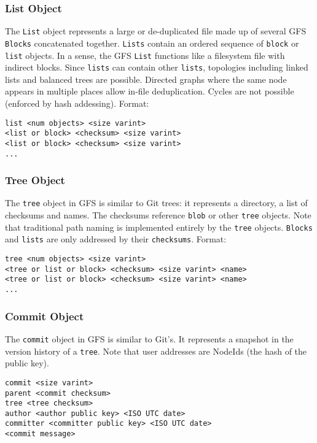 \documentclass{sig-alternate}
\begin{document}
\subsubsection{List Object}

The \texttt{List} object represents a large or de-duplicated file made up of
several GFS \texttt{Blocks} concatenated together. \texttt{Lists} contain
an ordered sequence of \texttt{block} or \texttt{list} objects.
In a sense, the GFS \texttt{List} functions like a filesystem file with
indirect blocks. Since \texttt{lists} can contain other \texttt{lists}, topologies including linked lists and balanced trees are possible. Directed graphs where the same node appears in multiple places allow in-file deduplication. Cycles are not possible (enforced by hash addessing).
Format:
\begin{verbatim}
list <num objects> <size varint>
<list or block> <checksum> <size varint>
<list or block> <checksum> <size varint>
...
\end{verbatim}


\subsubsection{Tree Object}

The \texttt{tree} object in GFS is similar to Git trees: it represents a
directory, a list of checksums and names. The checksums reference \texttt{blob}
or other \texttt{tree} objects. Note that traditional path naming
is implemented entirely by the \texttt{tree} objects. \texttt{Blocks} and
\texttt{lists} are only addressed by their \texttt{checksums}.
Format:
\begin{verbatim}
tree <num objects> <size varint>
<tree or list or block> <checksum> <size varint> <name>
<tree or list or block> <checksum> <size varint> <name>
...
\end{verbatim}

\subsubsection{Commit Object}

The \texttt{commit} object in GFS is similar to Git's. It represents a
snapshot in the version history of a \texttt{tree}. Note that user
addresses are NodeIds (the hash of the public key).

\begin{verbatim}
commit <size varint>
parent <commit checksum>
tree <tree checksum>
author <author public key> <ISO UTC date>
committer <committer public key> <ISO UTC date>
<commit message>
\end{verbatim}
\end{document}
